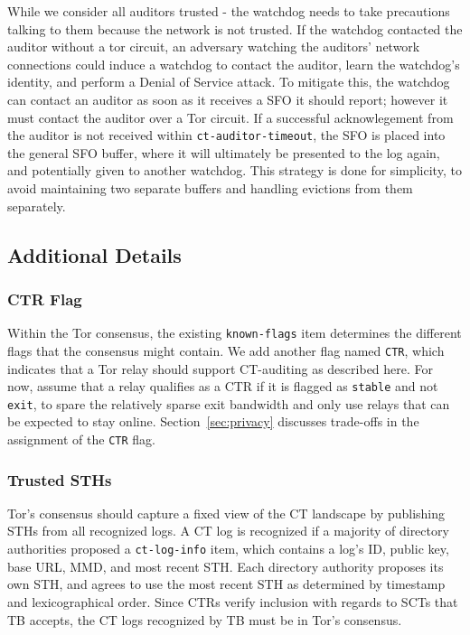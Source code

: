 While we consider all auditors trusted - the watchdog needs to take precautions talking to them because the network is not trusted. If the watchdog contacted the auditor without a tor circuit, an adversary watching the auditors' network connections could induce a watchdog to contact the auditor, learn the watchdog's identity, and perform a Denial of Service attack. To mitigate this, the watchdog can contact an auditor as soon as it receives a SFO it should report; however it must contact the auditor over a Tor circuit. If a successful acknowlegement from the auditor is not received within \texttt{ct-auditor-timeout}, the SFO is placed into the general SFO buffer, where it will ultimately be presented to the log again, and potentially given to another watchdog. This strategy is done for simplicity, to avoid maintaining two separate buffers and handling evictions from them separately.

\subsection{Additional Details} \label{sec:base:consensus}

\subsubsection{CTR Flag} \label{sec:base:consensus:ctr-flag}
Within the Tor consensus, the existing \texttt{known-flags} item determines the
different flags that the consensus might contain.  We add another flag named
\texttt{CTR}, which indicates that a Tor relay should support CT-auditing as
described here. For now, assume that a relay qualifies as a CTR if it is flagged
as \texttt{stable} and not \texttt{exit}, to spare the relatively sparse exit
bandwidth and only use relays that can be expected to stay online.
Section~\ref{sec:privacy} discusses trade-offs in the assignment of the
\texttt{CTR} flag.

\subsubsection{Trusted STHs}
Tor's consensus should capture a fixed view of the CT landscape by publishing
STHs from all recognized logs.  A CT log is recognized if a majority of directory
authorities proposed a \texttt{ct-log-info} item, which contains a log's ID,
public key, base URL, MMD, and most recent STH.  Each directory authority
proposes its own STH, and agrees to use the most recent STH as determined by
timestamp and lexicographical order.  Since CTRs verify inclusion with regards
to SCTs that TB accepts, the CT logs recognized by TB must be
in Tor's consensus.

